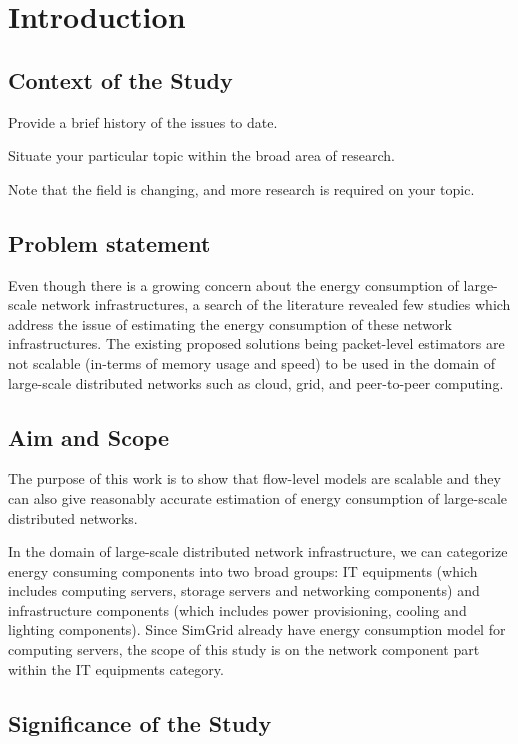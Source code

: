 \chapter{Introduction}
\label{chapter:intro}

\section{Context of the Study}	 
Provide a brief history of the issues to date.

Situate your particular topic within the broad area of research.

Note that the field is changing, and more research is required on your topic.
\section{Problem statement}
Even though there is a growing concern about the energy consumption of large-scale network infrastructures, a search of the literature revealed few studies which address the issue of estimating the energy consumption of these network infrastructures. The existing proposed solutions being packet-level estimators are not scalable (in-terms of memory usage and speed) to be used in the domain of large-scale distributed networks such as cloud, grid, and peer-to-peer computing. 

\section{Aim and Scope}

The purpose of this work is to show that flow-level models are scalable and they can also give reasonably accurate estimation of energy consumption of large-scale distributed networks.

In the domain of large-scale distributed network infrastructure, we can categorize energy consuming components into two broad groups: IT equipments (which includes computing servers, storage servers and networking components) and infrastructure components (which includes power provisioning, cooling and lighting components). Since SimGrid already have energy consumption model for computing servers, the scope of this study is on the network component part within the IT equipments category.

\section{Significance of the Study}

